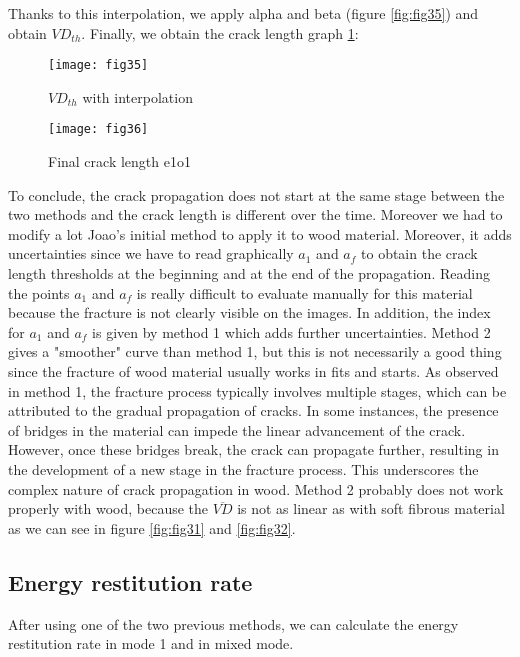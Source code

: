 Thanks to this interpolation, we apply alpha and beta (figure \ref{fig:fig35}) and obtain $VD_{th}$. Finally, we obtain the crack length graph \ref{fig:fig36}:

\begin{figure}[h]
	\begin{minipage}[c]{.46\linewidth}
		\centering
		\texttt{[image: fig35]}
		\caption{$VD_{th}$ with interpolation}
		\label{fig:fig35}
	\end{minipage}
	\hfill%
	\begin{minipage}[c]{.46\linewidth}
		\centering
		\texttt{[image: fig36]}
		\caption{Final crack length e1o1}
		\label{fig:fig36}
	\end{minipage}
\end{figure}

To conclude, the crack propagation does not start at the same stage between the two methods and the crack length is different over the time. Moreover we had to modify a lot Joao's initial method to apply it to wood material. Moreover, it adds uncertainties since we have to read graphically $a_1$ and $a_f$ to obtain the crack length thresholds at the beginning and at the end of the propagation. Reading the points $a_1$ and $a_f$ is really difficult to evaluate manually for this material because the fracture is not clearly visible on the images. In addition, the index for $a_1$ and $a_f$ is given by method 1 which adds further uncertainties. Method 2 gives a "smoother" curve than method 1, but this is not necessarily a good thing since the fracture of wood material usually works in fits and starts.
As observed in method 1, the fracture process typically involves multiple stages, which can be attributed to the gradual propagation of cracks. In some instances, the presence of bridges in the material can impede the linear advancement of the crack. However, once these bridges break, the crack can propagate further, resulting in the development of a new stage in the fracture process. This underscores the complex nature of crack propagation in wood. Method 2 probably does not work properly with wood, because the $\overline{VD}$ is not as linear as with soft fibrous material  as we can see in figure \ref{fig:fig31} and \ref{fig:fig32}.

\subsection{Energy restitution rate}

After using one of the two previous methods, we can calculate the energy restitution rate in mode 1 and in mixed mode.

